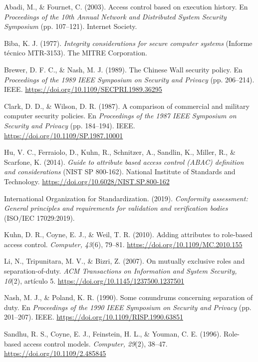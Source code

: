 \documentclass[11pt,letterpaper]{article}
\begin{document}
{\small
\setlength{\parskip}{0.45em}

Abadi, M., \& Fournet, C. (2003). Access control based on execution history. En \emph{Proceedings of
the 10th Annual Network and Distributed System Security Symposium} (pp. 107--121). Internet Society.

Biba, K. J. (1977). \emph{Integrity considerations for secure computer systems} (Informe técnico
MTR-3153). The MITRE Corporation.

Brewer, D. F. C., \& Nash, M. J. (1989). The Chinese Wall security policy. En \emph{Proceedings of the
1989 IEEE Symposium on Security and Privacy} (pp. 206--214). IEEE.
\url{https://doi.org/10.1109/SECPRI.1989.36295}

Clark, D. D., \& Wilson, D. R. (1987). A comparison of commercial and military computer security
policies. En \emph{Proceedings of the 1987 IEEE Symposium on Security and Privacy} (pp. 184--194). IEEE.
\url{https://doi.org/10.1109/SP.1987.10001}

Hu, V. C., Ferraiolo, D., Kuhn, R., Schnitzer, A., Sandlin, K., Miller, R., \& Scarfone, K. (2014).
\emph{Guide to attribute based access control (ABAC) definition and considerations} (NIST SP 800-162).
National Institute of Standards and Technology. \url{https://doi.org/10.6028/NIST.SP.800-162}

International Organization for Standardization. (2019). \emph{Conformity assessment: General
principles and requirements for validation and verification bodies} (ISO/IEC 17029:2019).

Kuhn, D. R., Coyne, E. J., \& Weil, T. R. (2010). Adding attributes to role-based access control.
\emph{Computer, 43}(6), 79--81. \url{https://doi.org/10.1109/MC.2010.155}

Li, N., Tripunitara, M. V., \& Bizri, Z. (2007). On mutually exclusive roles and separation-of-duty.
\emph{ACM Transactions on Information and System Security, 10}(2), artículo 5.
\url{https://doi.org/10.1145/1237500.1237501}

Nash, M. J., \& Poland, K. R. (1990). Some conundrums concerning separation of duty. En
\emph{Proceedings of the 1990 IEEE Symposium on Security and Privacy} (pp. 201--207). IEEE.
\url{https://doi.org/10.1109/RISP.1990.63851}

Sandhu, R. S., Coyne, E. J., Feinstein, H. L., \& Youman, C. E. (1996). Role-based access control
models. \emph{Computer, 29}(2), 38--47. \url{https://doi.org/10.1109/2.485845}

}
\end{document}
